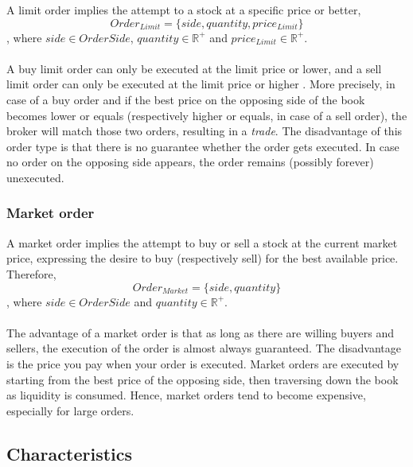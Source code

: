 A limit order implies the attempt to a stock at a specific price or better,
\begin{equation}
    Order_{Limit}=\{side, quantity, price_{Limit}\}
\end{equation}
, where $side \in OrderSide$, $quantity \in \mathbb{R^+}$ and $price_{Limit} \in \mathbb{R^+}$.
\\
\\
A buy limit order can only be executed at the limit price or lower, and a sell limit order can only be executed at the limit price or higher \cite{sec-limit-order}.
More precisely, in case of a buy order and if the best price on the opposing side of the book becomes lower or equals (respectively higher or equals, in case of a sell order), the broker will match those two orders, resulting in a \textit{trade}.
The disadvantage of this order type is that there is no guarantee whether the order gets executed.
In case no order on the opposing side appears, the order remains (possibly forever) unexecuted.

\subsubsection{Market order}
\label{sec:market-order}

A market order implies the attempt to buy or sell a stock at the current market price, expressing the desire to buy (respectively sell) for the best available price. Therefore,
\begin{equation}
Order_{Market}=\{side, quantity\}
\end{equation}
, where $side \in OrderSide$ and $quantity \in \mathbb{R^+}$.
\\
\\
The advantage of a market order is that as long as there are willing buyers and sellers, the execution of the order is almost always guaranteed. \cite{sec-market-order}
The disadvantage is the price you pay when your order is executed.
Market orders are executed by starting from the best price of the opposing side, then traversing down the book as liquidity is consumed. 
Hence, market orders tend to become expensive, especially for large orders.

\subsection{Characteristics}
\label{sec:ob-characteristics}

